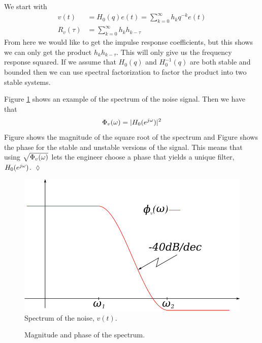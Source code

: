 We start with
\begin{align*}
v(t) &= H_0(q)e(t) = \sum_{k=0}^\infty h_kq^{-k}e(t) \\
R_v(\tau) &= \sum_{k=0}^\infty h_kh_{k-\tau}
\end{align*}
From here we would like to get the impulse response coefficients, but this shows we can only get the product $h_kh_{k-\tau}$. This will only give us the frequency response squared. If we assume that $H_0(q)$ and $H_0^{-1}(q)$ are both stable and bounded then we can use spectral factorization to factor the product into two stable systems.

\begin{example}
Figure \ref{fig:07spectrum} shows an example of the spectrum of the noise signal. Then we have that
$$\Phi_v(\omega) = |H_0(e^{j\omega})|^2$$
Figure  shows the magnitude of the square root of the spectrum and Figure  shows the phase for the stable and unstable versions of the signal. This means that using $\sqrt{\Phi_v(\omega)}$ lets the engineer choose a phase that yields a unique filter, $H_0(e^{j\omega})$.
$\lozenge$
\end{example}

\begin{figure}[ht!]
  \centering
  \includegraphics[width=.5\textwidth]{images/07spectrum}
  \caption{Spectrum of the noise, $v(t)$.}
  \label{fig:07spectrum}
\end{figure}

\begin{figure}[ht!]
  \centering
   \hfill
   \hfill
  \caption{Magnitude and phase of the spectrum.}
  \label{fig:07magphase}
\end{figure}

